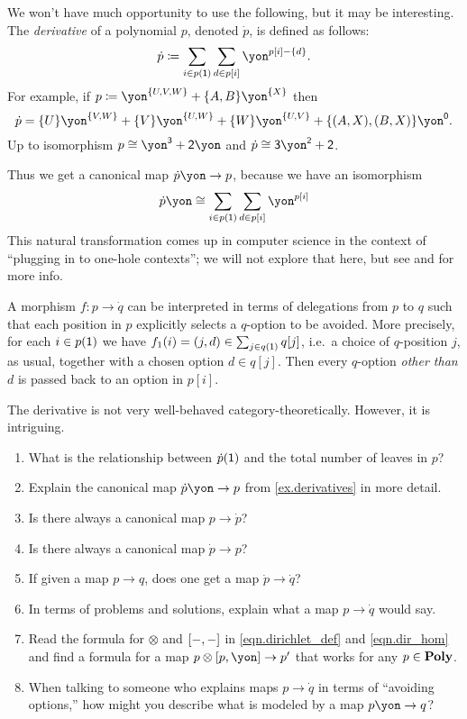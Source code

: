 \documentclass[Book-Poly]{subfiles}
\begin{document}
\begin{example}[Derivatives]\label{ex.derivatives}
We won't have much opportunity to use the following, but it may be interesting. The \emph{derivative} of a polynomial $p$, denoted $\dot{p}$, is defined as follows:
\[
\dot{p}\coloneqq\sum_{i\in p(\1)}\sum_{d\in p[i]}\yon^{p[i]-\{d\}}.
\]
For example, if $p\coloneq\yon^{\{U,V,W\}}+\{A,B\}\yon^{\{X\}}$ then 
\[\dot{p}=\{U\}\yon^{\{V,W\}}+\{V\}\yon^{\{U,W\}}+\{W\}\yon^{\{U,V\}}+\{(A,X),(B,X)\}\yon^\0.\]
Up to isomorphism $p\cong\yon^\3+\2\yon$ and $\dot{p}\cong\3\yon^\2+\2$.

Thus we get a canonical map $\dot{p}\yon\to p$, because we have an isomorphism
\[
\dot{p}\yon\cong\sum_{i\in p(\1)}\sum_{d\in p[i]}\yon^{p[i]}
\]
This natural transformation comes up in computer science in the context of ``plugging in to one-hole contexts''; we will not explore that here, but see \cite{mcbride} and \cite{abbot2003derivatives} for more info.%

A morphism $f\colon p\to \dot{q}$ can be interpreted in terms of delegations from $p$ to $q$ such that each position in $p$ explicitly selects a $q$-option to be avoided. More precisely, for each $i\in p(\textsf{1})$ we have $f_1(i)=(j,d)\in \sum_{j\in q(\textsf{1})}q[j]$, i.e.\ a choice of $q$-position $j$, as usual, together with a chosen option $d\in q[j]$. Then every $q$-option \emph{other than $d$} is passed back to an option in $p[i]$.
\end{example}

\begin{exercise}
The derivative is not very well-behaved category-theoretically. However, it is intriguing.
\begin{enumerate}
	\item What is the relationship between $\dot{p}(\textsf{1})$ and the total number of leaves in $p$?
	\item Explain the canonical map $\dot{p}\yon\to p$ from \cref{ex.derivatives} in more detail.
	\item Is there always a canonical map $p\to \dot{p}$?
	\item Is there always a canonical map $\dot{p}\to p$?
	\item If given a map $p\to q$, does one get a map $\dot{p}\to\dot{q}$?
	\item In terms of problems and solutions, explain what a map $p\to \dot{q}$ would say.
	\item Read the formula for $\otimes$ and $[-,-]$ in \eqref{eqn.dirichlet_def} and \eqref{eqn.dir_hom} and find a formula for a map $p\otimes\ihom{p,\yon}\to p'$ that works for any $p\in\textbf{Poly}$.
	\item When talking to someone who explains maps $p\to\dot{q}$ in terms of ``avoiding options,'' how might you describe what is modeled by a map $p\yon\to q$?
\end{enumerate}
\end{exercise}
\end{document}
